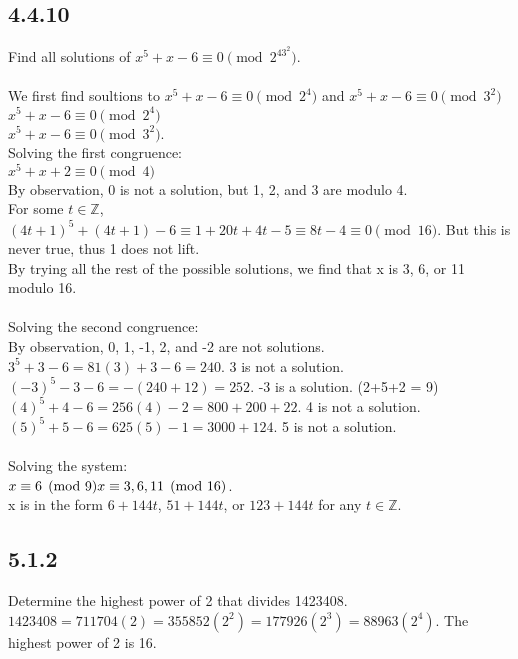 \documentclass{article}
\begin{document}
\newpage
\subsection{4.4.10}
Find all solutions of $x^5+x-6 \equiv 0 \pmod{2^43^2}$.
\\
\\We first find soultions to $x^5+x-6 \equiv 0 \pmod{2^4}$ and $x^5+x-6 \equiv 0 \pmod{3^2}$
\\$x^5+x-6 \equiv 0 \pmod{2^4}$
\\$x^5+x-6 \equiv 0 \pmod{3^2}$.
\\Solving the first congruence:
\\$x^5+x+2 \equiv 0 \pmod{4}$
\\By observation, 0 is not a solution, but 1, 2, and 3 are modulo 4.
\\For some $t \in \mathbb{Z}$, $(4t+1)^5+(4t+1)-6 \equiv 1+20t+4t-5
\equiv 8t-4 \equiv 0 \pmod{16}$. But this is never true, thus 1 does not lift.
\\By trying all the rest of the possible solutions, we find that
x is 3, 6, or 11 modulo 16.
\\
\\Solving the second congruence:
\\By observation, 0, 1, -1, 2, and -2 are not solutions. 
\\$3^5+3-6 = 81(3)+3-6 = 240$. 3 is not a solution.
\\$(-3)^5-3-6 = -(240+12) = 252$. -3 is a solution. (2+5+2 = 9)
\\$(4)^5+4-6 = 256(4)-2 = 800+200+22$. 4 is not a solution.
\\$(5)^5+5-6 = 625(5)-1 = 3000+124$. 5 is not a solution.
\\
\\Solving the system:
\\$x \equiv 6 \pmod9
\\x \equiv 3, 6, 11 \pmod{16}$.
\\x is in the form $6+144t$, $51+144t$, or $123+144t$ for any $t \in \mathbb{Z}$.

\subsection{5.1.2}
Determine the highest power of 2 that divides 1423408.
\\
$1423408 = 711704(2) = 355852(2^2) = 177926(2^3) = 88963(2^4)$.
The highest power of 2 is 16.
\end{document}
